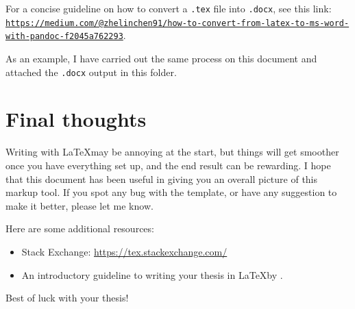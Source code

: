 \documentclass[12pt, letterpaper]{article}
\begin{document}
For a concise guideline on how to convert a \verb|.tex| file into \verb|.docx|, see this link: \href{https://medium.com/@zhelinchen91/how-to-convert-from-latex-to-ms-word-with-pandoc-f2045a762293}{\nolinkurl{https://medium.com/@zhelinchen91/how-to-convert-from-latex-to-ms-word-with-pandoc-f2045a762293}}.

As an example, I have carried out the same process on this document and attached the \verb|.docx| output in this folder. 

\section{Final thoughts}
Writing with \LaTeX may be annoying at the start, but things will get smoother once you have everything set up, and the end result can be rewarding. I hope that this document has been useful in giving you an overall picture of this markup tool. If you spot any bug with the template, or have any suggestion to make it better, please let me know. 

Here are some additional resources:
\begin{itemize}[noitemsep]
\item{Stack Exchange: \href{https://tex.stackexchange.com/}{https://tex.stackexchange.com/}}
\item{An introductory guideline to writing your thesis in \LaTeX by \textcite{mori2007writing}.}
\end{itemize}

Best of luck with your thesis!
 
 


\printbibliography
\end{document}
